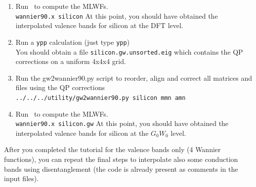 \documentclass[a4paper,11pt,twoside]{article}
\begin{document}
\begin{enumerate}
\item Run \wannier\ to compute the MLWFs.\\
{\tt wannier90.x silicon}
At this point, you should have obtained the interpolated valence bands for silicon at the DFT level.
\item Run a {\tt ypp} calculation (just type {\tt ypp})\\
You should obtain a file {\tt silicon.gw.unsorted.eig} which contains the QP corrections on a uniform 4x4x4 grid.
\item Run the gw2wannier90.py script to reorder, align and correct all matrices and files using the QP corrections\\
{\tt ../../../utility/gw2wannier90.py silicon mmn amn}
\item Run \wannier\ to compute the MLWFs.\\
{\tt wannier90.x silicon.gw}
At this point, you should have obtained the interpolated valence bands for silicon at the $G_0W_0$ level.
\end{enumerate}
After you completed the tutorial for the valence bands only (4 Wannier functions), you can repeat the final steps to interpolate also some conduction bands using disentanglement (the code is already present as comments in the input files).




\end{document}
